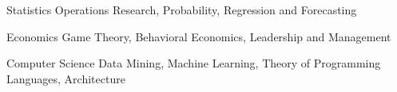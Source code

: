 

\begin{cvskills}

\cvskill
{Statistics} %
{Operations Research, Probability, Regression and Forecasting} %

\cvskill
  {Economics} %
  {Game Theory, Behavioral Economics, Leadership and Management} %

  \cvskill
    {Computer Science} %
    {Data Mining, Machine Learning, Theory of Programming Languages, Architecture} %

\end{cvskills}
